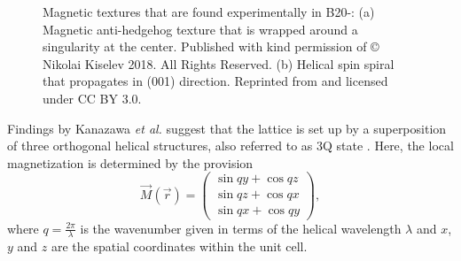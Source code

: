 \documentclass[graybox]{svmult}
\newcommand{\beq}{\begin{equation}}
\newcommand{\eeq}{\end{equation}}
\begin{document}
\begin{figure}[htb]
	\hfill
	\hfill
 \caption{Magnetic textures that are found experimentally in B20-: (a) 
	Magnetic anti-hedgehog texture that is wrapped around a singularity at the center.
	Published with kind permission of © Nikolai Kiselev 2018. All Rights Reserved. (b) Helical
	spin spiral that propagates in (001) direction. Reprinted from \cite{rybakov_new_2016} and
	licensed under CC BY 3.0.}
\end{figure}
Findings by Kanazawa \textit{et al.} suggest that the lattice is set up by a superposition of three orthogonal
helical structures, also referred to as 3Q state \cite{kanazawa_noncentrosymmetric_2017}. 
Here, the local magnetization is determined by the provision
\beq
\label{eq:3q_formula}
\vec{M}(\vec{r}) =
\begin{pmatrix}
	\sin{qy} + \cos{qz} \\
	\sin{qz} + \cos{qx} \\
	\sin{qx} + \cos{qy}
\end{pmatrix},
\eeq
where $q=\frac{2\pi}{\lambda}$ is the wavenumber given in terms of the helical wavelength $\lambda$ and
$x$, $y$ and $z$ are the spatial coordinates within the unit cell.
\end{document}
